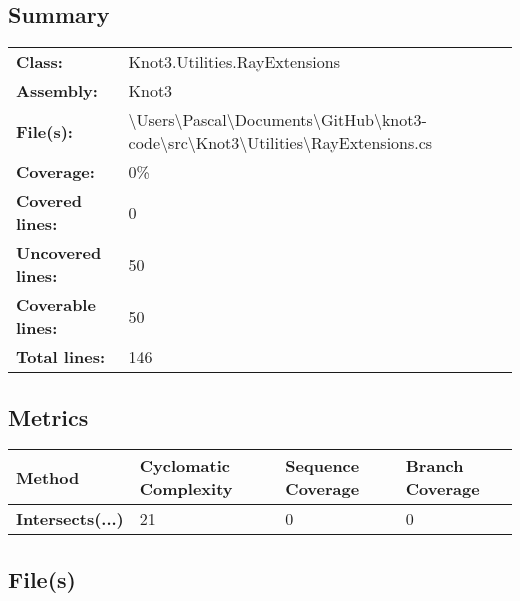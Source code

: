 \documentclass[a4paper,10pt]{article}
\begin{document}
\subsection{Summary}
\begin{longtable}[l]{ll}
\textbf{Class:} & Knot3.Utilities.RayExtensions\\
\textbf{Assembly:} & Knot3\\
\textbf{File(s):} & \begin{minipage}[t]{12cm}{\textbackslash Users\textbackslash Pascal\textbackslash Documents\textbackslash GitHub\textbackslash knot3-code\textbackslash src\textbackslash Knot3\textbackslash Utilities\textbackslash RayExtensions.cs}\end{minipage} \\
\textbf{Coverage:} & 0\%\\
\textbf{Covered lines:} & 0\\
\textbf{Uncovered lines:} & 50\\
\textbf{Coverable lines:} & 50\\
\textbf{Total lines:} & 146\\
\end{longtable}
\subsection{Metrics}
\begin{longtable}[l]{|l|l|l|l|}
\hline
\textbf{Method} & \textbf{Cyclomatic Complexity} & \textbf{Sequence Coverage} & \textbf{Branch Coverage}\\
\hline
\textbf{Intersects(...)} & 21 & 0 & 0\\
\hline
\end{longtable}
\subsection{File(s)}
\end{document}
